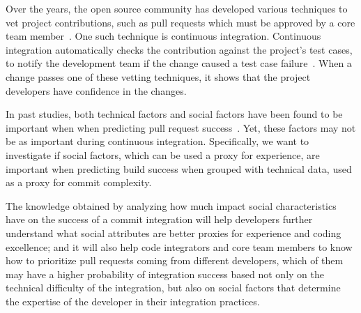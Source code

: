\documentclass[10pt, conference]{IEEEtran}
\begin{document}
Over the years, the open source
community has developed various techniques to vet project contributions, such as pull
requests which must be approved by a core team member~\cite{gousios14}. One such
technique is continuous integration. Continuous integration automatically checks
the contribution against the project's test cases, to notify the development
team if the change caused a test case failure~\cite{Meyer14}.  When a change
passes one of these vetting techniques, it shows that the project developers
have confidence in the changes.

In past studies, both technical factors and social factors have been found to be
important when when predicting pull request success~\cite{tsay14icse,tsay14fse}.
Yet, these factors may not be as important during continuous integration.
Specifically, we want to investigate if social factors, which can be used a
proxy for experience, are important when predicting build success when grouped
with technical data, used as a proxy for commit complexity.

The knowledge obtained by 
analyzing how much impact social characteristics have on the success of a commit 
integration will help developers further understand what social attributes are 
better proxies for experience and coding excellence; and it will also help code 
integrators and core team members to know how to prioritize pull requests coming 
from different developers, which of them may have a higher probability of 
integration success based not only on the technical difficulty of the 
integration, but also on social factors that determine the expertise of the 
developer in their integration practices.
\end{document}
